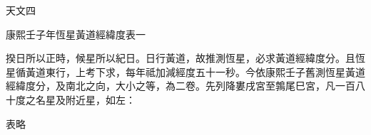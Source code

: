 
\begin{pinyinscope}
天文四

康熙壬子年恆星黃道經緯度表一

揆日所以正時，候星所以紀日。日行黃道，故推測恆星，必求黃道經緯度分。且恆星循黃道東行，上考下求，每年祗加減經度五十一秒。今依康熙壬子舊測恆星黃道經緯度分，及南北之向，大小之等，為二卷。先列降婁戌宮至鶉尾巳宮，凡一百八十度之名星及附近星，如左：

表略


\end{pinyinscope}